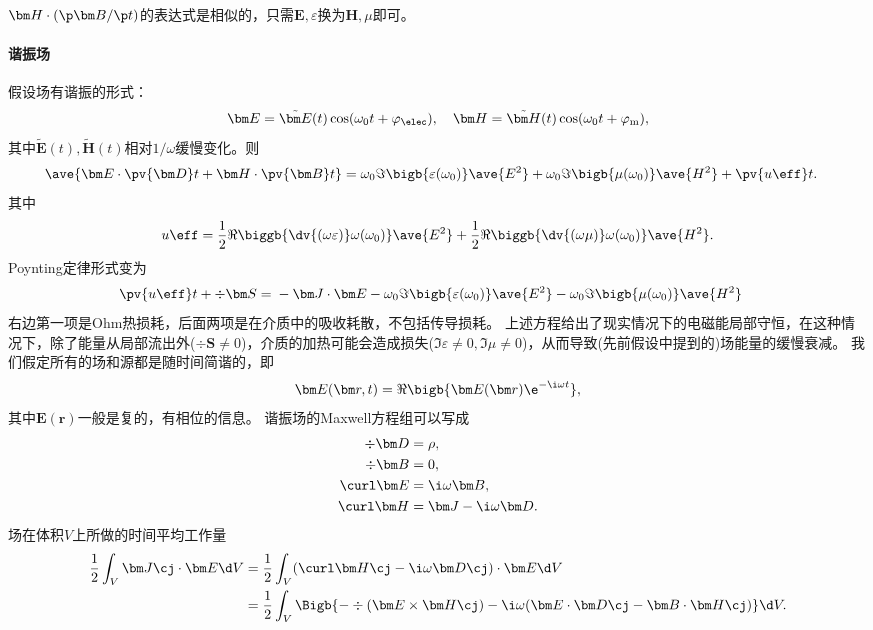 $\bm H\cdot(\p\bm B/\p t)$的表达式是相似的，只需$\bm E,\varepsilon$换为$\bm H,\mu$即可。
\paragraph{谐振场}
假设场有谐振的形式： 
\[
    \bm E=\tilde{\bm E}(t)\cos(\omega_0t+\varphi_\elec),\quad\bm H=\tilde{\bm H}(t)\cos(\omega_0t+\varphi_\text m),
\]
其中$\tilde{\bm E}(t),\tilde{\bm H}(t)$相对$1/\omega$缓慢变化。则
\begin{align*}
    \ave{\bm E\cdot\pv{\bm D}t+\bm H\cdot\pv{\bm B}t}={}&\omega_0\Im\bigb{\varepsilon(\omega_0)}\ave{E^2}+
    \omega_0\Im\bigb{\mu(\omega_0)}\ave{H^2}+\pv{u\eff}t.
\end{align*}
其中 
\[
    u\eff=\frac12\Re\biggb{\dv{(\omega\varepsilon)}\omega(\omega_0)}\ave{E^2}+\frac12\Re\biggb{\dv{(\omega\mu)}\omega(\omega_0)}\ave{H^2}.
\]
Poynting定律形式变为
\begin{align}
    \label{eqn:Poynting with loss}
    \pv{u\eff}t+\div\bm S={}&-\bm J\cdot\bm E-\omega_0\Im\bigb{\varepsilon(\omega_0)}\ave{E^2}-\omega_0\Im\bigb{\mu(\omega_0)}\ave{H^2}
\end{align}
右边第一项是Ohm热损耗，后面两项是在介质中的吸收耗散，不包括传导损耗。
上述方程给出了现实情况下的电磁能局部守恒，在这种情况下，除了能量从局部流出外($\div\bm S\neq 0$)，介质的加热可能会造成损失($\Im\varepsilon\neq 0,\Im\mu\neq 0$)，从而导致(先前假设中提到的)场能量的缓慢衰减。
我们假定所有的场和源都是随时间简谐的，即 
\[
    \bm E(\bm r,t)=\Re\bigb{\bm E(\bm r)\e^{-\i\omega t}},
\]
其中$\bm E(\bm r)$一般是复的，有相位的信息。
谐振场的Maxwell方程组可以写成
\begin{subequations}
    \begin{align}
        \div\bm D&=\rho,\\
        \div\bm B&=0,\\
        \label{eqn:Maxwell curlE freq}
        \curl\bm E&=\i\omega\bm B,\\
        \label{eqn:Maxwell curlH freq}
        \curl\bm H&=\bm J-\i\omega\bm D.
    \end{align}
\end{subequations}
场在体积$V$上所做的时间平均工作量
\begin{align*}
    \frac12\int_V\bm J\cj\cdot\bm E\d V&=\frac12\int_V(\curl\bm H\cj-\i\omega\bm D\cj)\cdot\bm E\d V\\
    &=\frac12\int_V\Bigb{-\div(\bm E\times\bm H\cj)-\i\omega(\bm E\cdot\bm D\cj-\bm B\cdot\bm H\cj)}\d V.
\end{align*}
